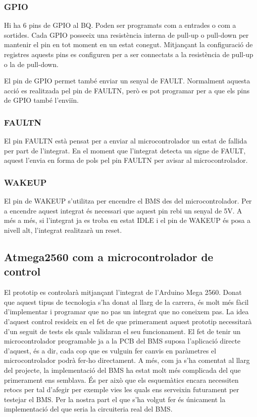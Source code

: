 \subsubsection{GPIO}
Hi ha 6 pins de GPIO al BQ. Poden ser programats com a entrades o com a sortides. Cada GPIO posseeix una resistència interna de pull-up o pull-down per mantenir el pin en tot moment en un estat conegut. Mitjançant la configuració de registres aquests pins es configuren per a ser connectats a la resistència de pull-up o la de pull-down. 

El pin de GPIO permet també enviar un senyal de FAULT. Normalment aquesta acció es realitzada pel pin de FAULTN, però es pot programar per a que els pins de GPIO també l'enviïn. 

\subsubsection{FAULTN}
El pin FAULTN està pensat per a enviar al microcontrolador un estat de fallida per part de l'integrat. En el moment que l'integrat detecta un signe de FAULT, aquest l'envia en forma de pols pel pin FAULTN per avisar al microcontrolador. 

\subsubsection{WAKEUP}
El pin de WAKEUP s'utilitza per encendre el BMS des del microcontrolador. Per a encendre aquest integrat és necessari que aquest pin rebi un senyal de 5V.  A més a més, si l'integrat ja es troba en estat IDLE i el pin de WAKEUP és posa a nivell alt, l'integrat realitzarà un reset.

\subsection{Atmega2560 com a microcontrolador de control}
El prototip es controlarà mitjançant l'integrat de l'Arduino Mega 2560. Donat que aquest tipus de tecnologia s'ha donat al llarg de la carrera, és molt més fàcil d'implementar i programar que no pas un integrat que no coneixem pas. La idea d'aquest control resideix en el fet de que primerament aquest prototip necessitarà d'un seguit de tests els quals validaran el seu funcionament. El fet de tenir un microcontrolador programable ja a la PCB del BMS suposa l'aplicació directe d'aquest, és a dir, cada cop que es vulguin fer canvis en paràmetres el microcontrolador podrà fer-ho directament. A més, com ja s'ha comentat al llarg del projecte, la implementació del BMS ha estat molt més complicada del que primerament ens semblava. És per això que els esquemàtics encara necessiten retocs per tal d'afegir per exemple vies les quals ens serveixin futurament per testejar el BMS. Per la nostra part el que s'ha volgut fer és únicament la implementació del que seria la circuiteria real del BMS. 

